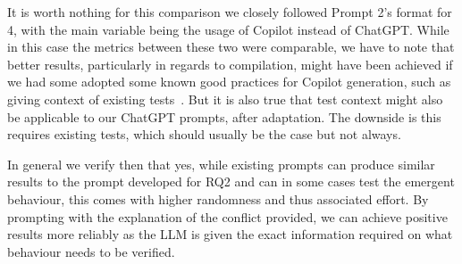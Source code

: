 It is worth nothing for this comparison we closely followed Prompt 2's format for 4, with the main variable being the usage of Copilot
instead of ChatGPT. While in this case the metrics between these two were comparable, we have to note that better results, particularly
in regards to compilation, might have been achieved if we had some adopted some known good practices for Copilot generation, such as giving
context of existing tests~\cite{kn:githubcopilot}. But it is also true that test context might also be applicable to our ChatGPT prompts,
after adaptation. The downside is this requires existing tests, which should usually be the case but not always.

In general we verify then that yes, while existing prompts can produce similar results to the prompt developed for RQ2
and can in some cases test the emergent behaviour, this comes with higher randomness and thus associated effort.
By prompting with the explanation of the conflict provided, we can achieve positive results more reliably as the
LLM is given the exact information required on what behaviour needs to be verified.
